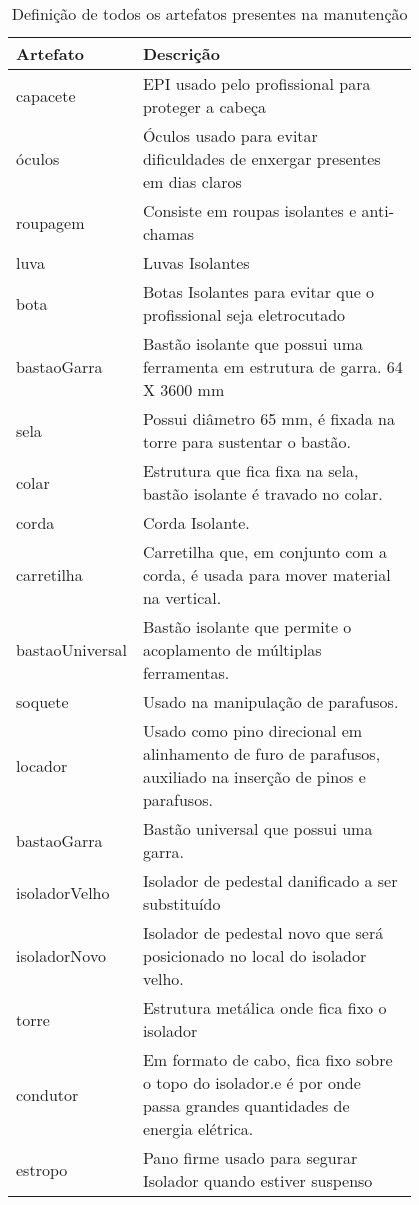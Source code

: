 \begin{table}[H]
\centering
\caption{Definição de todos os artefatos presentes na manutenção}
\begin{tabular}{|l|p{0.8\linewidth}|}
\hline
\textbf{Artefato} & \textbf{Descrição} \\ \hline
capacete & EPI usado pelo profissional para proteger a cabeça \\ \hline
óculos & Óculos usado para evitar dificuldades de enxergar presentes em dias claros \\ \hline
roupagem & Consiste em roupas isolantes e anti-chamas \\ \hline
luva & Luvas Isolantes \\ \hline
bota & Botas Isolantes para evitar que o profissional seja eletrocutado \\ \hline
bastaoGarra & Bastão isolante que possui uma ferramenta em estrutura de garra. 64 X 3600 mm \\ \hline
sela & Possui diâmetro 65 mm, é fixada na torre para sustentar o bastão. \\ \hline
colar & Estrutura que fica fixa na sela, bastão isolante é travado no colar. \\ \hline
corda & Corda Isolante. \\ \hline
carretilha & Carretilha que, em conjunto com a corda, é usada para mover material na vertical. \\ \hline
bastaoUniversal & Bastão isolante que permite o acoplamento de múltiplas ferramentas. \\ \hline
soquete & Usado na manipulação de parafusos. \\ \hline
locador & Usado como pino direcional em alinhamento de furo de parafusos, auxiliado na inserção de pinos e parafusos. \\ \hline
bastaoGarra & Bastão universal que possui uma garra. \\ \hline
isoladorVelho & Isolador de pedestal danificado a ser substituído \\ \hline
isoladorNovo & Isolador de pedestal novo que será posicionado no local do isolador velho. \\ \hline
torre & Estrutura metálica onde fica fixo o isolador \\ \hline
condutor & Em formato de cabo, fica fixo sobre o topo do isolador.e é por onde passa grandes quantidades de energia elétrica. \\ \hline
estropo & Pano firme usado para segurar Isolador quando estiver suspenso \\ \hline

\end{tabular}
\end{table}
